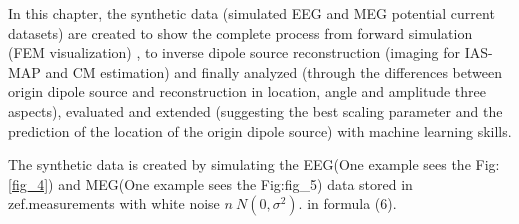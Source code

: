 \documentclass[5p]{elsarticle}
\begin{document}
\begin{frontmatter}

In this chapter, the synthetic data (simulated EEG and MEG potential current datasets) are created to show the complete process from forward simulation (FEM visualization) , to inverse dipole source reconstruction (imaging for IAS-MAP and CM estimation) and finally analyzed (through the differences between origin dipole source and reconstruction in location, angle and amplitude three aspects), evaluated and extended (suggesting the best scaling parameter and the prediction of the location of the origin dipole source) with machine learning skills.  


\begin{figure}[h!]
 \end{figure}

The synthetic data is created by simulating the EEG(One example sees the Fig: \ref{fig_4}) and MEG(One example sees the Fig:fig_5) data stored in zef.measurements with white noise $ n~N(0,\sigma^{2})$. in formula (6).



\end{frontmatter}
\end{document}
